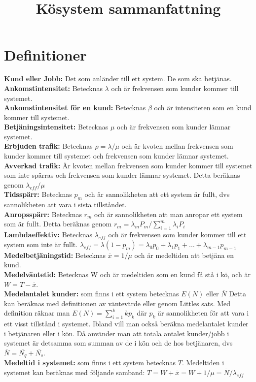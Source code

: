 \documentclass{article}
\title{Kösystem sammanfattning}
\begin{document}
 	\maketitle
 	\section*{Definitioner}
 	{\bf Kund eller Jobb:} Det som anländer till ett system. De som ska betjänas. 
 	{\bf Ankomstintensitet:} Betecknas $\lambda$ och är frekvensen som kunder kommer till systemet.\\
 	{\bf Ankomstintensitet för en kund:} Betecknas $\beta$ och är intensiteten som en kund kommer till systemet.\\
 	{\bf Betjäningsintensitet:} Betecknas $\mu$ och är frekvensen som kunder lämnar systemet.\\
 	{\bf Erbjuden trafik:} Betecknas $\rho=\lambda/\mu$ och är kvoten mellan frekvensen som kunder kommer till systemet och frekvensen som kunder lämnar systemet.\\
 	{\bf Avverkad trafik:} Är kvoten mellan frekvensen som kunder kommer till systemet som inte spärras och frekvensen som kunder lämnar systemet. Detta beräknas genom $\lambda_{eff}/\mu$ \\
 	{\bf Tidsspärr:} Betecknas $p_m$ och är sannolikheten att ett system är fullt, dvs sannolikheten att vara i sista tillståndet.\\
 	{\bf Anropsspärr:} Betecknas $r_m$ och är sannolikheten att man anropar ett system som är fullt. Detta beräknas genom $r_m={\lambda_mP_m}/\sum_{i=1}^{m}\lambda_iP_i$\\
 	{\bf Lambdaeffektiv:} Betecknas $\lambda_{eff}$ och är frekvensen som kunder kommer till ett system som inte är fullt. $\lambda_{eff}=\lambda(1 - p_m)=\lambda_0p_0+\lambda_1p_1+\dots+\lambda_{m-1}p_{m-1}$\\ 	
 	{\bf Medelbetjäningstid:} Betecknas $\overline{x}=1/\mu$ och är medeltiden att betjäna en kund. \\
 	{\bf Medelväntetid:} Betecknas W och är medeltiden som en kund få stå i kö, och är $W=T-\overline{x}$.\\
	{ \bf Medelantalet kunder:} som finns i ett system betecknas $E(N)$ eller $\overline{N}$ Detta kan beräknas med definitionen av väntevärde eller genom Littles sats. Med definition räknar man $E(N)=\sum_{i=1}^{k} kp_k$ där $p_k$ är sannolikheten för att vara i ett visst tillstånd i systemet. Ibland vill man också beräkna medelantalet kunder i betjänaren eller i kön. Då använder man att totala antalet kunder/jobb i systemet är detsamma som summan av de i kön och de hos betjänaren, dvs $\overline{N}=\overline{N_q}+\overline{N_s}$.\\
	{ \bf Medeltid i systemet:} som finns i ett system betecknas $T$. Medeltiden i systemet kan beräknas med följande samband:  $T=W+\overline{x} = W + 1/\mu = \overline{N}/\lambda_{eff}$
\end{document}
